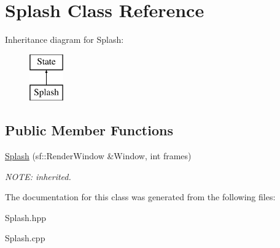 \hypertarget{class_splash}{\section{Splash Class Reference}
\label{class_splash}
}
Inheritance diagram for Splash\-:\begin{figure}[H]
\begin{center}
\leavevmode
\includegraphics[height=2.000000cm]{class_splash}
\end{center}
\end{figure}
\subsection*{Public Member Functions}
\begin{DoxyCompactItemize}
\item 
\hypertarget{class_splash_a2241fe067b1fa921d37918e5cb240d59}{\hyperlink{class_splash_a2241fe067b1fa921d37918e5cb240d59}{Splash} (sf\-::\-Render\-Window \&Window, int frames)}\label{class_splash_a2241fe067b1fa921d37918e5cb240d59}

\begin{DoxyCompactList}\small\item\em N\-O\-T\-E\-: inherited. \end{DoxyCompactList}\end{DoxyCompactItemize}


The documentation for this class was generated from the following files\-:\begin{DoxyCompactItemize}
\item 
Splash.\-hpp\item 
Splash.\-cpp\end{DoxyCompactItemize}
